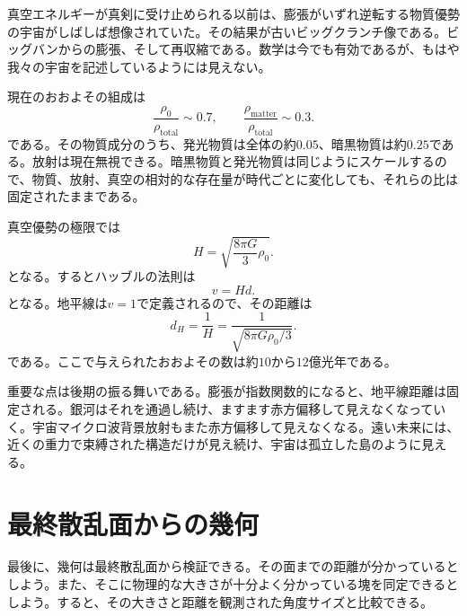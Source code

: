 真空エネルギーが真剣に受け止められる以前は、膨張がいずれ逆転する物質優勢の宇宙がしばしば想像されていた。その結果が古いビッグクランチ像である。ビッグバンからの膨張、そして再収縮である。数学は今でも有効であるが、もはや我々の宇宙を記述しているようには見えない。

\begin{classroomqa}
\end{classroomqa}

現在のおおよその組成は
\begin{equation}
\frac{\rho_0}{\rho_{\text{total}}}\sim 0.7,
\qquad
\frac{\rho_{\text{matter}}}{\rho_{\text{total}}}\sim 0.3.
\end{equation}
である。その物質成分のうち、発光物質は全体の約\(0.05\)、暗黒物質は約\(0.25\)である。放射は現在無視できる。暗黒物質と発光物質は同じようにスケールするので、物質、放射、真空の相対的な存在量が時代ごとに変化しても、それらの比は固定されたままである。

真空優勢の極限では
\begin{equation}
H=\sqrt{\frac{8\pi G}{3}\rho_0}.
\end{equation}
となる。するとハッブルの法則は
\begin{equation}
v=Hd.
\end{equation}
となる。地平線は\(v=1\)で定義されるので、その距離は
\begin{equation}
d_H=\frac{1}{H}
=
\frac{1}{\sqrt{8\pi G\rho_0/3}}.
\end{equation}
である。ここで与えられたおおよその数は約\(10\)から\(12\)億光年である。

重要な点は後期の振る舞いである。膨張が指数関数的になると、地平線距離は固定される。銀河はそれを通過し続け、ますます赤方偏移して見えなくなっていく。宇宙マイクロ波背景放射もまた赤方偏移して見えなくなる。遠い未来には、近くの重力で束縛された構造だけが見え続け、宇宙は孤立した島のように見える。

\section{最終散乱面からの幾何}

最後に、幾何は最終散乱面から検証できる。その面までの距離が分かっているとしよう。また、そこに物理的な大きさが十分よく分かっている塊を同定できるとしよう。すると、その大きさと距離を観測された角度サイズと比較できる。

